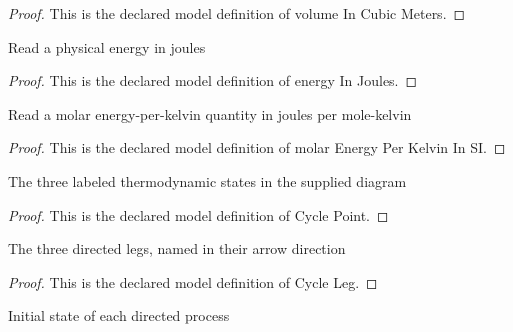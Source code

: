 \begin{proof}
  This is the declared model definition of volume In Cubic Meters.
\end{proof}
\begin{definition}
  \label{def:physics:phyx-mini-0353:phyxminiproblems-problemphyxmini0353-energyinjoules}
  Read a physical energy in joules
\end{definition}
\begin{proof}
  This is the declared model definition of energy In Joules.
\end{proof}
\begin{definition}
  \label{def:physics:phyx-mini-0353:phyxminiproblems-problemphyxmini0353-molarenergyperkelvininsi}
  Read a molar energy-per-kelvin quantity in joules per mole-kelvin
\end{definition}
\begin{proof}
  This is the declared model definition of molar Energy Per Kelvin In SI.
\end{proof}
\begin{definition}
  \label{def:physics:phyx-mini-0353:phyxminiproblems-problemphyxmini0353-cyclepoint}
  The three labeled thermodynamic states in the supplied diagram
\end{definition}
\begin{proof}
  This is the declared model definition of Cycle Point.
\end{proof}
\begin{definition}
  \label{def:physics:phyx-mini-0353:phyxminiproblems-problemphyxmini0353-cycleleg}
  The three directed legs, named in their arrow direction
\end{definition}
\begin{proof}
  This is the declared model definition of Cycle Leg.
\end{proof}
\begin{definition}
  \label{def:physics:phyx-mini-0353:phyxminiproblems-problemphyxmini0353-startpoint}
  Initial state of each directed process
\end{definition}
